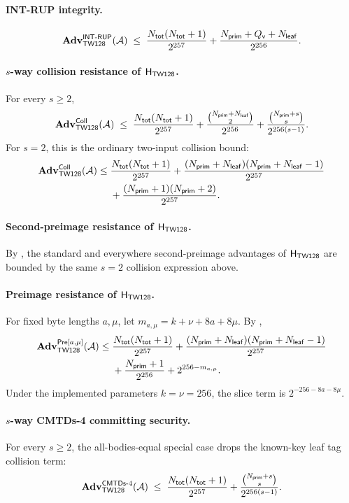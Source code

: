 \paragraph{\textsf{INT-RUP} integrity.}
\[
  \mathbf{Adv}^{\mathsf{INT\text{-}RUP}}_{\textsf{TW128}}(\mathcal{A})
  \;\leq\;
  \frac{N_{\mathsf{tot}}(N_{\mathsf{tot}} + 1)}{2^{257}}
  + \frac{N_{\mathsf{prim}} + Q_{\mathsf{v}} + N_{\mathsf{leaf}}}{2^{256}}.
\]

\paragraph{$s$-way collision resistance of $\mathsf{H}_{\mathsf{TW128}}$.}
For every $s \geq 2$,
\[
  \mathbf{Adv}^{\mathsf{Coll}}_{\textsf{TW128}}(\mathcal{A})
  \;\leq\;
  \frac{N_{\mathsf{tot}}(N_{\mathsf{tot}} + 1)}{2^{257}}
  + \frac{\binom{N_{\mathsf{prim}}+N_{\mathsf{leaf}}}{2}}{2^{256}}
  + \frac{\binom{N_{\mathsf{prim}} + s}{s}}{2^{256 (s - 1)}}.
\]
For $s=2$, this is the ordinary two-input collision bound:
\[
\begin{aligned}
  \mathbf{Adv}^{\mathsf{Coll}}_{\textsf{TW128}}(\mathcal{A})
\leq\;&
  \frac{N_{\mathsf{tot}}(N_{\mathsf{tot}} + 1)}{2^{257}}
  + \frac{(N_{\mathsf{prim}}+N_{\mathsf{leaf}})(N_{\mathsf{prim}}+N_{\mathsf{leaf}}-1)}{2^{257}} \\
& + \frac{(N_{\mathsf{prim}} + 1)(N_{\mathsf{prim}} + 2)}{2^{257}} .
\end{aligned}
\]

\paragraph{Second-preimage resistance of $\mathsf{H}_{\mathsf{TW128}}$.}
By , the standard and everywhere
\cite{RS04} second-preimage advantages of $\mathsf{H}_{\mathsf{TW128}}$ are bounded by the same
$s=2$ collision expression above.

\paragraph{Preimage resistance of $\mathsf{H}_{\mathsf{TW128}}$.}
For fixed byte lengths $a,\mu$, let
$m_{a,\mu}=k+\nu+8a+8\mu$. By ,
\[
\begin{aligned}
  \mathbf{Adv}^{\mathsf{Pre}[a,\mu]}_{\textsf{TW128}}(\mathcal{A})
\leq\;&
  \frac{N_{\mathsf{tot}}(N_{\mathsf{tot}} + 1)}{2^{257}}
  + \frac{(N_{\mathsf{prim}}+N_{\mathsf{leaf}})(N_{\mathsf{prim}}+N_{\mathsf{leaf}}-1)}{2^{257}} \\
& + \frac{N_{\mathsf{prim}} + 1}{2^{256}}
  + 2^{256 - m_{a,\mu}} .
\end{aligned}
\]
Under the implemented parameters $k = \nu = 256$, the slice term is
$2^{-256-8a-8\mu}$.

\paragraph{$s$-way CMTDs-4 committing security.}
For every $s \geq 2$, the all-bodies-equal special case drops the
known-key leaf tag collision term:
\[
  \mathbf{Adv}^{\mathsf{CMTDs}\text{-}4}_{\textsf{TW128}}(\mathcal{A})
  \;\leq\;
  \frac{N_{\mathsf{tot}}(N_{\mathsf{tot}} + 1)}{2^{257}}
  + \frac{\binom{N_{\mathsf{prim}} + s}{s}}{2^{256 (s - 1)}}.
\]

